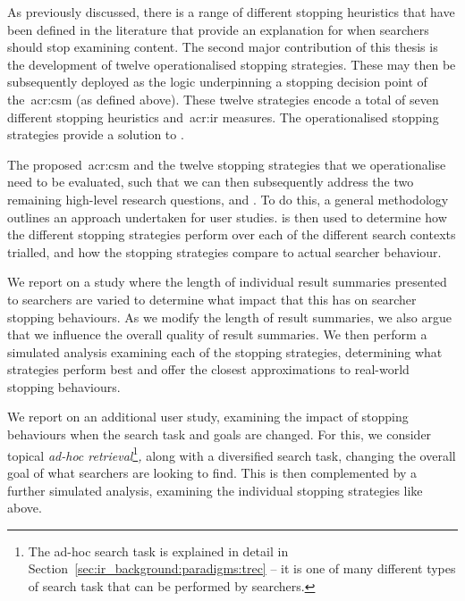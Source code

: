 \noindent
{} As previously discussed, there is a range of different stopping heuristics that have been defined in the literature that provide an explanation for when searchers should stop examining content. The second major contribution of this thesis is the development of twelve operationalised stopping strategies. These may then be subsequently deployed as the logic underpinning a stopping decision point of the~\gls{acr:csm} (as defined above). These twelve strategies encode a total of seven different stopping heuristics and~\gls{acr:ir} measures. The operationalised stopping strategies provide a solution to .

\noindent
{} The proposed~\gls{acr:csm} and the twelve stopping strategies that we operationalise need to be evaluated, such that we can then subsequently address the two remaining high-level research questions,  and . To do this, a general methodology outlines an approach undertaken for user studies.  is then used to determine how the different stopping strategies perform over each of the different search contexts trialled, and how the stopping strategies compare to actual searcher behaviour.

\noindent
{} We report on a study where the length of individual result summaries presented to searchers are varied to determine what impact that this has on searcher stopping behaviours. As we modify the length of result summaries, we also argue that we influence the overall quality of result summaries. We then perform a simulated analysis examining each of the stopping strategies, determining what strategies perform best and offer the closest approximations to real-world stopping behaviours.

\noindent
{} We report on an additional user study, examining the impact of stopping behaviours when the search task and goals are changed. For this, we consider topical \emph{ad-hoc retrieval}\footnote{The ad-hoc search task is explained in detail in Section~\ref{sec:ir_background:paradigms:trec} -- it is one of many different types of search task that can be performed by searchers.}\emph{,} along with a diversified search task, changing the overall goal of what searchers are looking to find. This is then complemented by a further simulated analysis, examining the individual stopping strategies like above.

